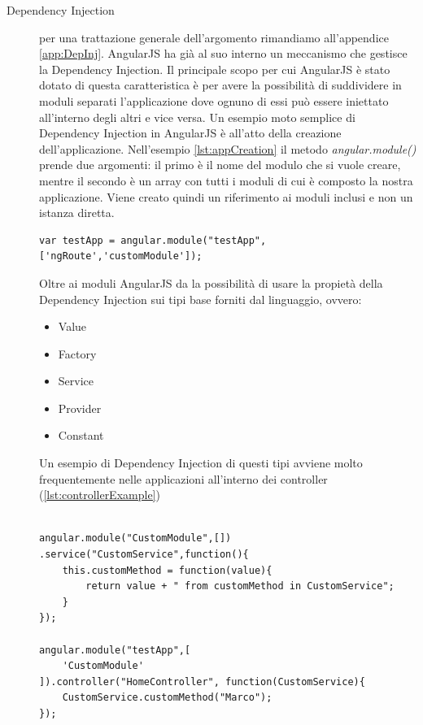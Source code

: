 \begin{description}
\item[Dependency Injection] per una trattazione generale dell'argomento rimandiamo all'appendice \ref{app:DepInj}. AngularJS ha già al suo interno un meccanismo che gestisce la Dependency Injection. Il principale scopo per cui AngularJS è stato dotato di questa caratteristica è per avere la possibilità di suddividere in moduli separati l'applicazione dove ognuno di essi può essere iniettato all'interno degli altri e vice versa. Un esempio moto semplice di Dependency Injection in AngularJS è all'atto della creazione dell'applicazione. Nell'esempio \ref{lst:appCreation} il metodo \textit{angular.module()} prende due argomenti: il primo è il nome del modulo che si vuole creare, mentre il secondo è un array con tutti i moduli di cui è composto la nostra applicazione. Viene creato quindi un riferimento ai moduli inclusi e non un istanza diretta.  
\begin{lstlisting}[caption = {Creazione di una applicazione in AngularJS con le relative dipendenze}, 
				   label = {lst:appCreation}]
	var testApp = angular.module("testApp",['ngRoute','customModule']);
\end{lstlisting}

Oltre ai moduli AngularJS da la possibilità di usare la propietà della Dependency Injection sui tipi base forniti dal linguaggio, ovvero:
\begin{itemize}
\item Value
\item Factory
\item Service
\item Provider
\item Constant
\end{itemize}
Un esempio di Dependency Injection di questi tipi avviene molto frequentemente nelle applicazioni all'interno dei controller (\ref{lst:controllerExample})

\begin{lstlisting}[caption = {Un esempio di creazione di un modulo e la sua inclusione all'interno di un altro}, 
				   label = {lst:controllerExample}]

angular.module("CustomModule",[])
.service("CustomService",function(){
	this.customMethod = function(value){
		return value + " from customMethod in CustomService";	
	}
});

angular.module("testApp",[
	'CustomModule'
]).controller("HomeController", function(CustomService){
	CustomService.customMethod("Marco");
});


\end{lstlisting}


\end{description}
